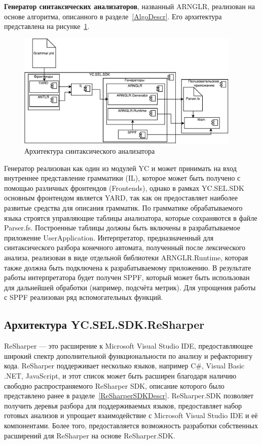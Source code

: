 \textbf{Генератор синтаксических анализаторов}, названный ARNGLR, реализован на основе алгоритма, описанного в разделе~\ref{AlgoDescr}. Его архитектура представлена на рисунке~\ref{fig:ParsArch}.  

\begin{figure}[h!]
\begin{center}
\includegraphics[width=0.95\textwidth]{pics/ARNGLRArch}
\caption{Архитектура синтаксического анализатора}
\label{fig:ParsArch} 
\end{center}
\end{figure}

Генератор реализован как один из модулей YC и может принимать на вход внутреннее представление грамматики (IL), которое может быть получено с помощью различных фронтендов (Frontends), однако в рамках YC.SEL.SDK 
основным фронтендом является YARD, так как он предоставляет наиболее развитые средства для описания грамматик. По грамматике обрабатываемого языка строятся управляющие таблицы анализатора, которые сохраняются в файле Parser.fs. 
Построенные таблицы должны быть включены в разрабатываемое приложение UserApplication. Интерпретатор, предназначенный для синтаксического разбора конечного автомата, полученный после лексического анализа, реализован 
в виде отдельной библиотеки ARNGLR.Runtime, которая также должна быть подключена к разрабатываемому приложению. В результате работы интерпретатора будет получен SPPF, который может быть использован для дальнейшей 
обработки (например, подсчёта метрик). Для упрощения работы с SPPF реализован ряд вспомогательных функций.

\subsection{Архитектура YC.SEL.SDK.ReSharper}

ReSharper --- это расширение к Microsoft Visual Studio IDE, предоставляющее широкий спектр  дополнительной функциональности по анализу и рефакторингу кода. ReSharper поддерживает несколько языков, например C\#, Visual Basic .NET, JavaScript, и этот список может быть расширен благодаря наличию свободно распространяемого ReSharper SDK, описание которого было представлено ранее в разделе~\ref{ReSharperSDKDescr}. ReSharper.SDK позволяет получить деревья разбора для поддерживаемых языков, предоставляет набор готовых анализов и упрощает взаимодействие с Microsoft Visual Studio IDE и её компонентами. Более того, предоставляется возможность разработки собственных расширений для ReSharper на основе ReSharper.SDK.

